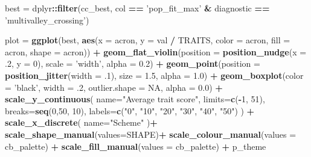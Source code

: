 \documentclass[]{book}
\newenvironment{Shaded}{\begin{snugshade}}{\end{snugshade}}
\newcommand{\DataTypeTok}[1]{\textcolor[rgb]{0.13,0.29,0.53}{#1}}
\newcommand{\DecValTok}[1]{\textcolor[rgb]{0.00,0.00,0.81}{#1}}
\newcommand{\FloatTok}[1]{\textcolor[rgb]{0.00,0.00,0.81}{#1}}
\newcommand{\KeywordTok}[1]{\textcolor[rgb]{0.13,0.29,0.53}{\textbf{#1}}}
\newcommand{\NormalTok}[1]{#1}
\newcommand{\OperatorTok}[1]{\textcolor[rgb]{0.81,0.36,0.00}{\textbf{#1}}}
\newcommand{\OtherTok}[1]{\textcolor[rgb]{0.56,0.35,0.01}{#1}}
\newcommand{\StringTok}[1]{\textcolor[rgb]{0.31,0.60,0.02}{#1}}
\begin{document}
\begin{Shaded}
\begin{Highlighting}[]
\NormalTok{best =}\StringTok{ }\NormalTok{dplyr}\OperatorTok{::}\KeywordTok{filter}\NormalTok{(cc_best, col }\OperatorTok{==}\StringTok{ 'pop_fit_max'} \OperatorTok{&}\StringTok{ }\NormalTok{diagnostic }\OperatorTok{==}\StringTok{ 'multivalley_crossing'}\NormalTok{)}

\NormalTok{plot =}\StringTok{ }\KeywordTok{ggplot}\NormalTok{(best, }\KeywordTok{aes}\NormalTok{(}\DataTypeTok{x =}\NormalTok{ acron, }\DataTypeTok{y =}\NormalTok{ val }\OperatorTok{/}\StringTok{ }\NormalTok{TRAITS, }\DataTypeTok{color =}\NormalTok{ acron, }\DataTypeTok{fill =}\NormalTok{ acron, }\DataTypeTok{shape =}\NormalTok{ acron)) }\OperatorTok{+}
\StringTok{  }\KeywordTok{geom_flat_violin}\NormalTok{(}\DataTypeTok{position =} \KeywordTok{position_nudge}\NormalTok{(}\DataTypeTok{x =} \FloatTok{.2}\NormalTok{, }\DataTypeTok{y =} \DecValTok{0}\NormalTok{), }\DataTypeTok{scale =} \StringTok{'width'}\NormalTok{, }\DataTypeTok{alpha =} \FloatTok{0.2}\NormalTok{) }\OperatorTok{+}
\StringTok{  }\KeywordTok{geom_point}\NormalTok{(}\DataTypeTok{position =} \KeywordTok{position_jitter}\NormalTok{(}\DataTypeTok{width =} \FloatTok{.1}\NormalTok{), }\DataTypeTok{size =} \FloatTok{1.5}\NormalTok{, }\DataTypeTok{alpha =} \FloatTok{1.0}\NormalTok{) }\OperatorTok{+}
\StringTok{  }\KeywordTok{geom_boxplot}\NormalTok{(}\DataTypeTok{color =} \StringTok{'black'}\NormalTok{, }\DataTypeTok{width =} \FloatTok{.2}\NormalTok{, }\DataTypeTok{outlier.shape =} \OtherTok{NA}\NormalTok{, }\DataTypeTok{alpha =} \FloatTok{0.0}\NormalTok{) }\OperatorTok{+}
\StringTok{  }\KeywordTok{scale_y_continuous}\NormalTok{(}
    \DataTypeTok{name=}\StringTok{"Average trait score"}\NormalTok{,}
    \DataTypeTok{limits=}\KeywordTok{c}\NormalTok{(}\OperatorTok{-}\DecValTok{1}\NormalTok{, }\DecValTok{51}\NormalTok{),}
    \DataTypeTok{breaks=}\KeywordTok{seq}\NormalTok{(}\DecValTok{0}\NormalTok{,}\DecValTok{50}\NormalTok{, }\DecValTok{10}\NormalTok{),}
    \DataTypeTok{labels=}\KeywordTok{c}\NormalTok{(}\StringTok{"0"}\NormalTok{, }\StringTok{"10"}\NormalTok{, }\StringTok{"20"}\NormalTok{, }\StringTok{"30"}\NormalTok{, }\StringTok{"40"}\NormalTok{, }\StringTok{"50"}\NormalTok{)}
\NormalTok{  ) }\OperatorTok{+}
\StringTok{  }\KeywordTok{scale_x_discrete}\NormalTok{(}
    \DataTypeTok{name=}\StringTok{"Scheme"}
\NormalTok{  )}\OperatorTok{+}
\StringTok{  }\KeywordTok{scale_shape_manual}\NormalTok{(}\DataTypeTok{values=}\NormalTok{SHAPE)}\OperatorTok{+}
\StringTok{  }\KeywordTok{scale_colour_manual}\NormalTok{(}\DataTypeTok{values =}\NormalTok{ cb_palette) }\OperatorTok{+}
\StringTok{  }\KeywordTok{scale_fill_manual}\NormalTok{(}\DataTypeTok{values =}\NormalTok{ cb_palette) }\OperatorTok{+}
\StringTok{  }\NormalTok{p_theme}


\end{Highlighting}
\end{Shaded}
\end{document}

